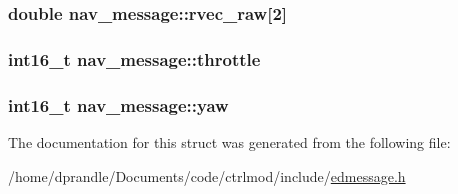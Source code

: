 \hypertarget{structnav__message_a8825929bbd4efd96ec1498bf89194e66}{
\subsubsection[{rvec\-\_\-raw}]{\setlength{\rightskip}{0pt plus 5cm}double nav\-\_\-message\-::rvec\-\_\-raw\mbox{[}2\mbox{]}}}\label{structnav__message_a8825929bbd4efd96ec1498bf89194e66}
\hypertarget{structnav__message_a32fbab7c09ee796640dd6e6748702576}{
\subsubsection[{throttle}]{\setlength{\rightskip}{0pt plus 5cm}int16\-\_\-t nav\-\_\-message\-::throttle}}\label{structnav__message_a32fbab7c09ee796640dd6e6748702576}
\hypertarget{structnav__message_acb15f6079e91e8d5bf14be16293da809}{
\subsubsection[{yaw}]{\setlength{\rightskip}{0pt plus 5cm}int16\-\_\-t nav\-\_\-message\-::yaw}}\label{structnav__message_acb15f6079e91e8d5bf14be16293da809}


The documentation for this struct was generated from the following file\-:\begin{DoxyCompactItemize}
\item 
/home/dprandle/\-Documents/code/ctrlmod/include/\hyperlink{edmessage_8h}{edmessage.\-h}\end{DoxyCompactItemize}
